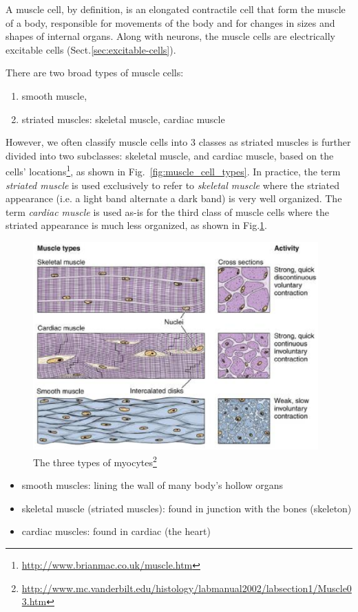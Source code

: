 A muscle cell, by definition, is an elongated contractile cell that
form the muscle of a body, responsible for movements of the body and
for changes in sizes and shapes of internal organs. 
Along with neurons, the muscle cells are electrically excitable cells
(Sect.\ref{sec:excitable-cells}).

There are two broad types of muscle cells:
\begin{enumerate}
  \item smooth muscle, 
  \item striated muscles: skeletal muscle, cardiac muscle
\end{enumerate}

However, we often classify muscle cells into 3 classes as striated muscles is
further divided into two subclasses: skeletal muscle, and cardiac muscle, based
on the cells' locations\footnote{\url{http://www.brianmac.co.uk/muscle.htm}}, as
shown in Fig.~\ref{fig:muscle_cell_types}.  In practice, the term {\it striated
muscle} is used exclusively to refer to {\it skeletal muscle} where the striated
appearance (i.e. a light band alternate a dark band) is very well organized. 
The term {\it cardiac muscle} is used as-is for the third class of muscle cells
where the striated appearance is much less organized, as shown in
Fig.\ref{fig:muscle_types}.

\begin{figure}[hbt]
 \centerline{\includegraphics[height=8cm, angle=0]{./images/muscle_types.eps}}
\caption{The three types of myocytes\footnote{\url{http://www.mc.vanderbilt.edu/histology/labmanual2002/labsection1/Muscle03.htm}}}
\label{fig:muscle_types}
\end{figure}

\begin{itemize}
\item smooth muscles: lining the wall of many body's hollow organs
\item skeletal muscle (striated muscles): found in
  junction with the bones (skeleton)
\item cardiac muscles: found in cardiac (the heart)
\end{itemize}


